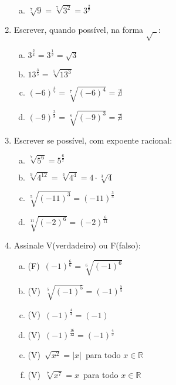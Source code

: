 \documentclass[a4paper,14pt]{article}
\begin{document}
\begin{multicols}{2}
\begin{enumerate}
\begin{enumerate}[a)]
        	\item $\sqrt[7]{9} = \sqrt[7]{3^2} = 3^\frac{2}{7}$ \\
        \end{enumerate}
        \item Escrever, quando possível, na forma $\sqrt{~~}$:
        \begin{enumerate}[a)] 
        	\item $3^\frac{2}{4} = 3^\frac{1}{2} = \sqrt{3}$\\
        	\item $13^\frac{3}{5} = \sqrt[5]{13^3}$ \\
        	\item $(-6)^\frac{4}{7} = \sqrt[7]{(-6)^4} = \nexists$ \\
        	\item $(-9)^\frac{3}{8} = \sqrt[8]{(-9)^3} = \nexists$ \\
        \end{enumerate}
        \item Escrever se possível, com expoente racional:
        \begin{enumerate}[a)]
        	\item $\sqrt[7]{5^6} = 5^\frac{6}{7}$ \\
        	\item $\sqrt[9]{4^{12}} = \sqrt[3]{4^4} = 4 \cdot \sqrt[3]{4}$ \\
        	\item $\sqrt[5]{(-11)^3} = (-11)^\frac{3}{5}$ \\
        	\item $\sqrt[11]{(-2)^6} = (-2)^\frac{6}{11}$ \\
        \end{enumerate}
        \item Assinale V(verdadeiro) ou F(falso):
        \begin{enumerate}[a)]
        	\item (F)~$(-1)^\frac{6}{6} = \sqrt[6]{(-1)^6}$ \\
        	\item (V)~$\sqrt[5]{(-1)^5} = (-1)^\frac{5}{5}$ \\
        	\item (V)~$(-1)^\frac{4}{4} = (-1)$ \\
        	\item (V)~$(-1)^\frac{16}{12} = (-1)^\frac{4}{3}$ \\
        	\item (V)~$\sqrt{x^2} = |x|$~para todo $x \in \mathbb{R}$ \\
        	\item (V)~$\sqrt[7]{x^7} = x$~para todo $x \in \mathbb{R}$ \\
        \end{enumerate}
    \end{enumerate}        
    \end{multicols}    
\end{document}
